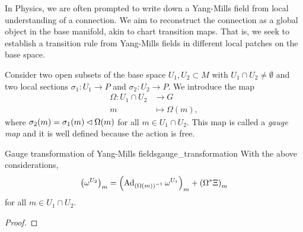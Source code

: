 In Physics, we are often prompted to write down a Yang-Mills field from local understanding of a connection. We aim to reconstruct the connection as a global object in the base manifold, akin to chart transition maps. That is, we seek to establish a transition rule from Yang-Mills fields in different local patches on the base space.

Consider two open subsets of the base space \(U_1, U_2 \subset M\) with \(U_1 \cap U_2 \neq \emptyset\) and two local sections \(\sigma_{1} : U_1 \to P\) and \(\sigma_{2} : U_2 \to P\). We introduce the map
\begin{align*}
    \Omega : U_1 \cap U_2 &\to G\\
                        m &\mapsto \Omega(m),
\end{align*}
where \(\sigma_2(m) = \sigma_1(m) \mathbin{\vartriangleleft} \Omega(m)\) for all \(m \in U_1 \cap U_2.\) This map is called a \emph{gauge map} and it is well defined because the action is free.

\begin{theorem}{Gauge transformation of Yang-Mills fields}{gauge_transformation}
    With the above considerations,
    \begin{equation*}
        \left(\omega^{U_2}\right)_m = \left(\operatorname{Ad}_{\left(\Omega(m)\right)^{-1}}\omega^{U_1}\right)_m + \left({\Omega}^{\ast}_{}{\Xi}\right)_m
    \end{equation*}
    for all \(m\in U_1 \cap U_2\).
\end{theorem}
\begin{proof}
\end{proof}

